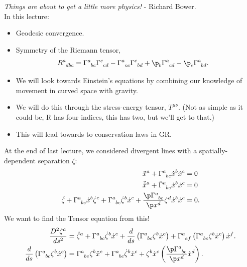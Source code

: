 \documentclass[a4paper, 11pt, normalem]{report}
\begin{document}
\chapter{}
\emph{Things are about to get a little more physics!} - Richard Bower. \\
In this lecture:
\begin{itemize}
    \item Geodesic convergence.
    \item Symmetry of the Riemann tensor, 
        \begin{align}
            \tensor{R}{^a_{dbc}} &= \tensor{\Gamma}{^a_{bc}}\tensor{\Gamma}{^e_{cd}} - \tensor{\Gamma}{^a_{ce}}\tensor{\Gamma}{^e_{bd}} + \p_b\tensor{\Gamma}{^a_{cd}}-\p_c\tensor{\Gamma}{^a_{bd}}.
        \end{align}
    \item We will look towards Einstein's equations by combining our knowledge of movement in curved space with gravity. 
    \item We will do this through the stress-energy tensor, $T^{\mu\nu}$. (Not as simple as it could be, R has four indices, this has two, but we'll get to that.)
    \item This will lead towards to conservation laws in GR.
\end{itemize}
At the end of last lecture, we considered divergent lines with a spatially-dependent separation $\zeta$:
\begin{align}
    \ddot{x}^a + \tensor{\Gamma}{^a_{bc}}\dot{x}^b\dot{x}^c &= 0 \\
    \ddot{\tilde{x}}^a + \tensor{\tilde{\Gamma}}{^a_{bc}}\dot{x}^b\dot{x}^c &= 0 \\
    \ddot{\zeta} + \tensor{\Gamma}{^a_{bc}}\dot{x}^b\dot{\zeta}^c + \tensor{\Gamma}{^a_{bc}}\dot{\zeta}^b\dot{x}^c + \frac{\p\tensor{\Gamma}{^a_{bc}}}{\p x^d}\zeta^d\dot{x}^b\dot{x}^c &= 0.
\end{align}
We want to find the Tensor equation from this! 
\begin{align}
    \frac{D^2\zeta^a}{ds^2} &= \ddot{\zeta}^a + \tensor{\Gamma}{^a_{bc}}\dot{\zeta}^b\dot{x}^c + \frac{d}{ds}\left(\tensor{\Gamma}{^a_{bc}}\zeta^b\dot{x}^c\right) + \tensor{\Gamma}{^a_{ef}}\left(\tensor{\Gamma}{^a_{bc}}\zeta^b\dot{x}^c\right)\dot{x}^f.\\
    \frac{d}{ds}\left(\tensor{\Gamma}{^a_{bc}}\zeta^b\dot{x}^c\right) &= \tensor{\Gamma}{^a_{be}}\zeta^b\ddot{x}^e + \tensor{\Gamma}{^a_{bc}}\dot{\zeta}^b\dot{x}^c + \zeta^b\dot{x}^c\left(\frac{\p\tensor{\Gamma}{^a_{bc}}}{\p x^d}\dot{x}^d\right).
\end{align}
\end{document}

